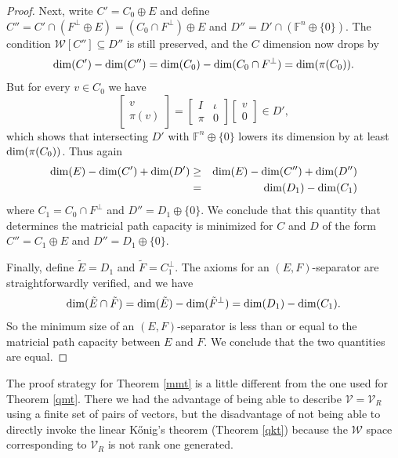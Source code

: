 \documentclass{amsart}
\theoremstyle{definition}
\begin{document}
\begin{proof}
Next, write $C' = C_0 \oplus E$ and define $C'' = C' \cap (F^\perp \oplus E) = (C_0 \cap F^\perp) \oplus E$ and $D'' = D' \cap (\mathbb{F}^n \oplus \{0\})$. The condition $\mathcal{W}[C''] \subseteq D''$ is still preserved, and the $C$ dimension now drops by $${\rm dim}(C') - {\rm dim}(C'') = {\rm dim}(C_0) - {\rm dim}(C_0 \cap F^\perp) = {\rm dim}(\pi(C_0)).$$ But for every $v \in C_0$ we have $$\left[\begin{matrix}v\\ \pi(v)\end{matrix}\right] = \left[\begin{matrix}I&\iota\\ \pi&0\end{matrix}\right]\left[\begin{matrix}v\\ 0\end{matrix}\right] \in D',$$ which shows that intersecting $D'$ with $\mathbb{F}^n \oplus \{0\}$ lowers its dimension by at least ${\rm dim}(\pi(C_0))$. Thus again \begin{eqnarray*}{\rm dim}(E) - {\rm dim}(C') + {\rm dim}(D') &\geq& {\rm dim}(E) - {\rm dim}(C'') + {\rm dim}(D'')\\
&=& {\rm dim}(D_1) - {\rm dim}(C_1)\end{eqnarray*} where $C_1 = C_0 \cap F^\perp$ and $D'' = D_1 \oplus \{0\}$. We conclude that this quantity that determines the matricial path capacity is minimized for $C$ and $D$ of the form $C'' = C_1 \oplus E$ and $D'' = D_1 \oplus \{0\}$.

Finally, define $\tilde{E} = D_1$ and $\tilde{F} = C_1^\perp$. The axioms for an $(E,F)$-separator are straightforwardly verified, and we have $${\rm dim}(\tilde{E} \cap \tilde{F}) = {\rm dim}(\tilde{E}) - {\rm dim}(\tilde{F}^\perp) = {\rm dim}(D_1) - {\rm dim}(C_1).$$ So the minimum size of an $(E,F)$-separator is less than or equal to the matricial path capacity between $E$ and $F$. We conclude that the two quantities are equal.
\end{proof}

The proof strategy for Theorem \ref{mmt} is a little different from the one used for Theorem \ref{qmt}. There we had the advantage of being able to describe $\mathcal{V} = \mathcal{V}_R$ using a finite set of pairs of vectors, but the disadvantage of not being able to directly invoke the linear Kőnig's theorem (Theorem \ref{qkt}) because the $\mathcal{W}$ space corresponding to $\mathcal{V}_R$ is not rank one generated.
\end{document}
